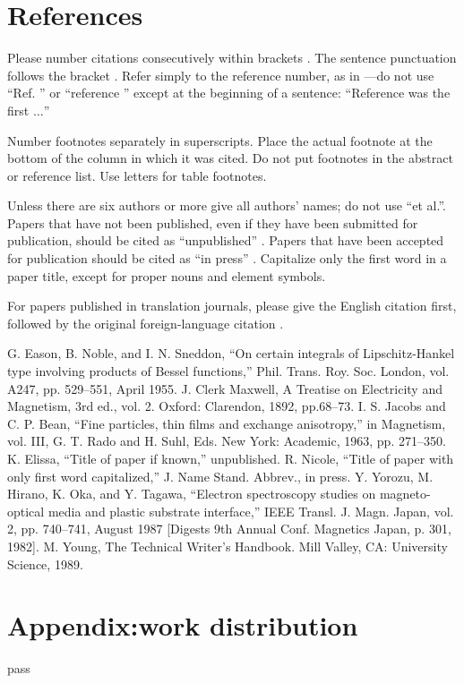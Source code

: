 \documentclass[conference]{IEEEtran}
\begin{document}
\section*{References}

Please number citations consecutively within brackets \cite{b1}. The 
sentence punctuation follows the bracket \cite{b2}. Refer simply to the reference 
number, as in \cite{b3}---do not use ``Ref. \cite{b3}'' or ``reference \cite{b3}'' except at 
the beginning of a sentence: ``Reference \cite{b3} was the first $\ldots$''

Number footnotes separately in superscripts. Place the actual footnote at 
the bottom of the column in which it was cited. Do not put footnotes in the 
abstract or reference list. Use letters for table footnotes.

Unless there are six authors or more give all authors' names; do not use 
``et al.''. Papers that have not been published, even if they have been 
submitted for publication, should be cited as ``unpublished'' \cite{b4}. Papers 
that have been accepted for publication should be cited as ``in press'' \cite{b5}. 
Capitalize only the first word in a paper title, except for proper nouns and 
element symbols.

For papers published in translation journals, please give the English 
citation first, followed by the original foreign-language citation \cite{b6}.

\begin{thebibliography}{00}
 G. Eason, B. Noble, and I. N. Sneddon, ``On certain integrals of Lipschitz-Hankel type involving products of Bessel functions,'' Phil. Trans. Roy. Soc. London, vol. A247, pp. 529--551, April 1955.
 J. Clerk Maxwell, A Treatise on Electricity and Magnetism, 3rd ed., vol. 2. Oxford: Clarendon, 1892, pp.68--73.
 I. S. Jacobs and C. P. Bean, ``Fine particles, thin films and exchange anisotropy,'' in Magnetism, vol. III, G. T. Rado and H. Suhl, Eds. New York: Academic, 1963, pp. 271--350.
 K. Elissa, ``Title of paper if known,'' unpublished.
 R. Nicole, ``Title of paper with only first word capitalized,'' J. Name Stand. Abbrev., in press.
 Y. Yorozu, M. Hirano, K. Oka, and Y. Tagawa, ``Electron spectroscopy studies on magneto-optical media and plastic substrate interface,'' IEEE Transl. J. Magn. Japan, vol. 2, pp. 740--741, August 1987 [Digests 9th Annual Conf. Magnetics Japan, p. 301, 1982].
 M. Young, The Technical Writer's Handbook. Mill Valley, CA: University Science, 1989.
\end{thebibliography}


\section{Appendix:work distribution}
pass
\end{document}

